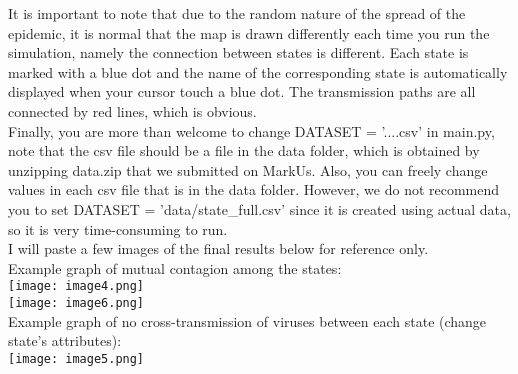 \documentclass[12pt]{article}
\begin{document}
It is important to note that due to the random nature of the spread of the epidemic, it is normal that the map is drawn differently each time you run the simulation, namely the connection between states is different. Each state is marked with a blue dot and the name of the corresponding state is automatically displayed when your cursor touch a blue dot. The transmission paths are all connected by red lines, which is obvious.\\
Finally, you are more than welcome to change DATASET = '....csv' in main.py, note that the csv file should be a file in the data folder, which is obtained by unzipping data.zip that we submitted on MarkUs. Also, you can freely change values in each csv file that is in the data folder. However, we do not recommend you to set DATASET = 'data/state\_full.csv' since it is created using actual data, so it is very time-consuming to run. \\I will paste a few images of the final results below for reference only.\\
Example graph of mutual contagion among the states:\\
\texttt{[image: image4.png]}\\
\texttt{[image: image6.png]}\\
Example graph of no cross-transmission of viruses between each state (change state's attributes):\\
\texttt{[image: image5.png]}

\newpage
\end{document}
